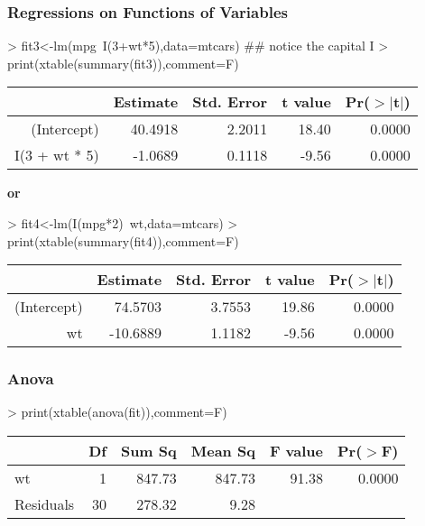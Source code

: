 \documentclass{article}
\begin{document}
\subsubsection*{Regressions on Functions of Variables}
\begin{Schunk}
\begin{Sinput}
> fit3<-lm(mpg~I(3+wt*5),data=mtcars) ## notice the capital I
> print(xtable(summary(fit3)),comment=F)
\end{Sinput}
\begin{table}[ht]
\centering
\begin{tabular}{rrrrr}
  \hline
 & Estimate & Std. Error & t value & Pr($>$$|$t$|$) \\ 
  \hline
(Intercept) & 40.4918 & 2.2011 & 18.40 & 0.0000 \\ 
  I(3 + wt * 5) & -1.0689 & 0.1118 & -9.56 & 0.0000 \\ 
   \hline
\end{tabular}
\end{table}\end{Schunk}
\textbf{or}
\begin{Schunk}
\begin{Sinput}
> fit4<-lm(I(mpg*2)~wt,data=mtcars)
> print(xtable(summary(fit4)),comment=F)
\end{Sinput}
\begin{table}[ht]
\centering
\begin{tabular}{rrrrr}
  \hline
 & Estimate & Std. Error & t value & Pr($>$$|$t$|$) \\ 
  \hline
(Intercept) & 74.5703 & 3.7553 & 19.86 & 0.0000 \\ 
  wt & -10.6889 & 1.1182 & -9.56 & 0.0000 \\ 
   \hline
\end{tabular}
\end{table}\end{Schunk}

\newpage

\subsubsection*{Anova}
\begin{Schunk}
\begin{Sinput}
> print(xtable(anova(fit)),comment=F)
\end{Sinput}
\begin{table}[ht]
\centering
\begin{tabular}{lrrrrr}
  \hline
 & Df & Sum Sq & Mean Sq & F value & Pr($>$F) \\ 
  \hline
wt & 1 & 847.73 & 847.73 & 91.38 & 0.0000 \\ 
  Residuals & 30 & 278.32 & 9.28 &  &  \\ 
   \hline
\end{tabular}
\end{table}\end{Schunk}
\end{document}
